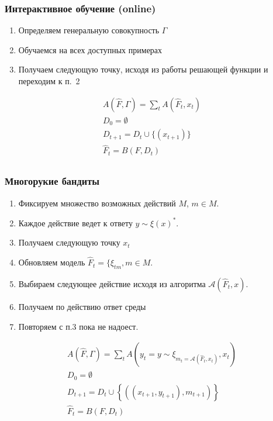 \documentclass[14pt, fleqn, xcolor={dvipsnames, table}]{beamer}
\begin{document}
\begin{frame}
\frametitle{Интерактивное обучение (online)}
\begin{enumerate}
	\item Определяем генеральную совокупность $\Gamma$
	\item Обучаемся на всех доступных примерах
	\item Получаем следующую точку, исходя из работы решающей функции и переходим к п.~2
\end{enumerate}
$$\begin{array}{l}
A(\hat{F}, \Gamma) = \sum_{t} A(\hat{F}_t, x_t) \\
D_0 = \emptyset \\
D_{t+1} = D_{t} \cup \{(x_{t+1})\} \\
\hat{F}_t = B(F, D_{t}) \\
\end{array}$$
\end{frame}

\begin{frame}
\frametitle{Многорукие бандиты}
\footnotesize
\begin{enumerate}
	\item Фиксируем множество возможных действий $M$, $m \in M$.
	\item Каждое действие ведет к ответу $y \sim \xi(x)^*$.
	\item Получаем следующую точку $x_t$
	\item Обновляем модель $\hat{F}_t = \{\xi_{tm}, m \in M$.
	\item Выбираем следующее действие исходя из алгоритма $\mathcal{A}(\hat{F}_t, x)$.
	\item Получаем по действию ответ среды
	\item Повторяем с п.3 пока не надоест.
\end{enumerate}
$$\begin{array}{l}
A(\hat{F}, \Gamma) = \sum_{t} A(y_t = y \sim \xi_{m_t = \mathcal{A}(\hat{F}_t, x_t)}, x_t) \\
D_0 = \emptyset \\
D_{t+1} = D_{t} \cup \left\{\left((x_{t+1}, y_{t+1}), m_{t+1}\right)\right\} \\
\hat{F}_t = B(F, D_t) \\
\end{array}$$
\end{frame}
\end{document}
